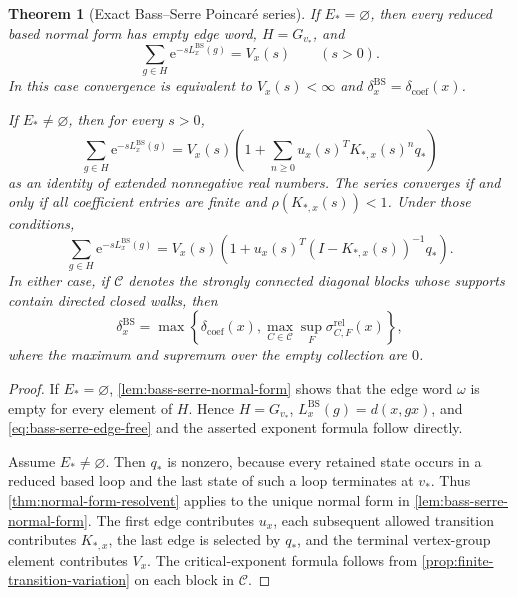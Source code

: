 \documentclass[11pt]{article}
\newtheorem{theorem}{Theorem}[section]
\theoremstyle{definition}
\newcommand{\coef}{\mathrm{coef}}
\newcommand{\BS}{\mathrm{BS}}
\newcommand{\rel}{\mathrm{rel}}
\newcommand{\e}{\mathrm e}
\begin{document}
\begin{theorem}[Exact Bass--Serre Poincar\'e series]
\label{thm:bass-serre-resolvent}
If $E_*=\varnothing$, then every reduced based normal form has empty edge word,
$H=G_{v_*}$, and
\begin{equation}\label{eq:bass-serre-edge-free}
 \sum_{g\in H}\e^{-sL^{\BS}_x(g)}=V_x(s)\qquad(s>0).
\end{equation}
In this case convergence is equivalent to $V_x(s)<\infty$ and
$\delta_x^{\BS}=\delta_{\coef}(x)$.

If $E_*\ne\varnothing$, then for every $s>0$,
\begin{equation}\label{eq:bass-serre-expanded}
 \sum_{g\in H}\e^{-sL^{\BS}_x(g)}
 =V_x(s)\left(1+\sum_{n\ge0}u_x(s)^TK_{*,x}(s)^nq_*\right)
\end{equation}
as an identity of extended nonnegative real numbers.  The series converges if and only if all
coefficient entries are finite and $\rho(K_{*,x}(s))<1$.  Under those conditions,
\begin{equation}\label{eq:bass-serre-resolvent}
 \sum_{g\in H}\e^{-sL^{\BS}_x(g)}
 =V_x(s)\left(1+u_x(s)^T(I-K_{*,x}(s))^{-1}q_*\right).
\end{equation}
In either case, if $\mathscr C$ denotes the strongly connected diagonal blocks whose supports
contain directed closed walks, then
\begin{equation}\label{eq:bass-serre-critical}
 \delta^{\BS}_x
 =\max\left\{\delta_{\coef}(x),
 \max_{C\in\mathscr C}\sup_F\sigma^{\rel}_{C,F}(x)\right\},
\end{equation}
where the maximum and supremum over the empty collection are $0$.
\end{theorem}

\begin{proof}
If $E_*=\varnothing$, \cref{lem:bass-serre-normal-form} shows that the edge word $\omega$
is empty for every element of $H$.  Hence $H=G_{v_*}$,
$L_x^{\BS}(g)=d(x,gx)$, and \eqref{eq:bass-serre-edge-free} and the asserted exponent formula
follow directly.

Assume $E_*\ne\varnothing$.  Then $q_*$ is nonzero, because every retained state occurs in a
reduced based loop and the last state of such a loop terminates at $v_*$.  Thus
\cref{thm:normal-form-resolvent} applies to the unique normal form in
\cref{lem:bass-serre-normal-form}.  The first edge contributes $u_x$, each subsequent allowed
transition contributes $K_{*,x}$, the last edge is selected by $q_*$, and the terminal
vertex-group element contributes $V_x$.  The critical-exponent formula follows from
\cref{prop:finite-transition-variation} on each block in $\mathscr C$.
\end{proof}
\end{document}
